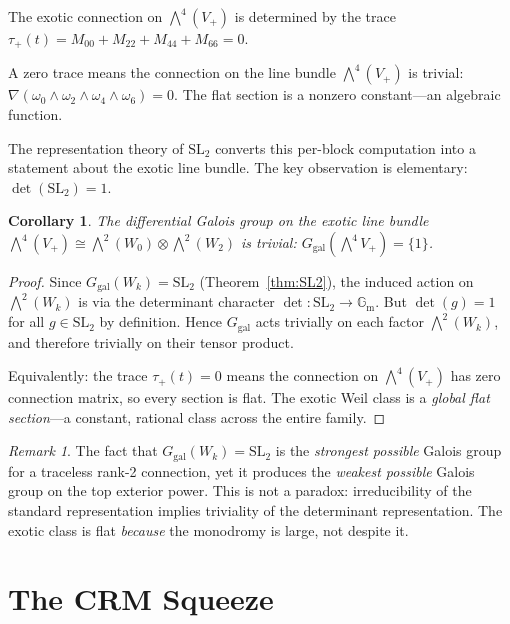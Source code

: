 \documentclass[11pt]{article}
\theoremstyle{plain}
\newtheorem{corollary}[theorem]{Corollary}
\theoremstyle{definition}
\theoremstyle{remark}
\newtheorem{remark}[theorem]{Remark}
\newcommand{\SL}{\mathrm{SL}}
\newcommand{\Ggal}{G_{\mathrm{gal}}}
\newcommand{\Gm}{\mathbb{G}_{\mathrm{m}}}
\begin{document}
The exotic connection on $\bigwedge^4(V_+)$ is determined by the
trace $\tau_+(t) = M_{00} + M_{22} + M_{44} + M_{66} = 0$.

A zero trace means the connection on the line bundle
$\bigwedge^4(V_+)$ is trivial: $\nabla(\omega_0 \wedge \omega_2
\wedge \omega_4 \wedge \omega_6) = 0$. The flat section is a
nonzero constant---an algebraic function.

The representation theory of $\SL_2$ converts this per-block computation
into a statement about the exotic line bundle. The key observation
is elementary: $\det(\SL_2) = 1$.

\begin{corollary}\label{cor:flat-exotic}
The differential Galois group on the exotic line bundle
$\bigwedge^4(V_+) \cong \bigwedge^2(W_0) \otimes \bigwedge^2(W_2)$
is trivial: $\Ggal(\bigwedge^4 V_+) = \{1\}$.
\end{corollary}

\begin{proof}
Since $\Ggal(W_k) = \SL_2$ (Theorem~\ref{thm:SL2}), the induced action
on $\bigwedge^2(W_k)$ is via the determinant character
$\det\colon \SL_2 \to \Gm$. But $\det(g) = 1$ for all $g \in \SL_2$
by definition. Hence $\Ggal$ acts trivially on each factor
$\bigwedge^2(W_k)$, and therefore trivially on their tensor product.

Equivalently: the trace $\tau_+(t) = 0$ means the connection on
$\bigwedge^4(V_+)$ has zero connection matrix, so every section is flat.
The exotic Weil class is a \emph{global flat section}---a constant,
rational class across the entire family.
\end{proof}

\begin{remark}
The fact that $\Ggal(W_k) = \SL_2$ is the \emph{strongest possible}
Galois group for a traceless rank-2 connection, yet it produces the
\emph{weakest possible} Galois group on the top exterior power.
This is not a paradox: irreducibility of the standard representation
implies triviality of the determinant representation. The exotic
class is flat \emph{because} the monodromy is large, not despite it.
\end{remark}

\section{The CRM Squeeze}\label{sec:squeeze}
\end{document}

